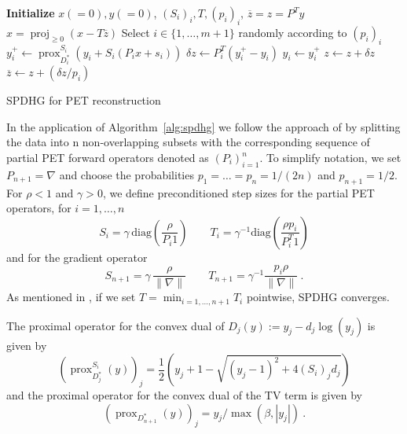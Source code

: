\documentclass[11pt,twocolumn,twoside]{article}
\DeclareMathOperator{\proj}{proj}
\DeclareMathOperator{\prox}{prox}
\begin{document}
\begin{algorithm}[t]
\begin{algorithmic}[1]
\State \textbf{Initialize} $x(=0),y(=0)$, $(S_i)_i,T,(p_i)_i$,
\State $\overline{z} = z = P^T y$
\Repeat
	\State $x = \proj_{\geq 0} (x - T \overline{z})$
	\State Select $i \in \{ 1,\ldots,m+1\} $ randomly according to $(p_i)_i$
	\State \quad $y_i^+ \gets \prox_{D_i^*}^{S_i} ( y_i + S_i  ( P_i x + s_i))$
	\State \quad $\delta z \gets P_i^T (y_i^+ - y_i)$
	\State \quad $y_i \gets y_i^+$
	\State $z \gets z + \delta z$
	\State $\overline{z} \gets  z + (\delta z/p_i)$
\State {}
\end{algorithmic}
\caption{SPDHG for PET reconstruction \cite{Ehrhardt2019}}
\label{alg:spdhg}
\end{algorithm}

In the application of Algorithm~\ref{alg:spdhg} we follow the approach of \cite{Ehrhardt2019}
by splitting the data into n non-overlapping subsets with the corresponding 
sequence of partial PET forward operators denoted as $(P_i)_{i=1}^n$.
To simplify notation, we set $P_{n+1} = \nabla$ and choose the probabilities $p_1=\ldots=p_n = 1/(2n)$
and $p_{n+1} = 1/2$.
For $\rho<1$ and $\gamma>0$, we define preconditioned step sizes for the partial PET operators, 
for $i=1,\ldots,n$
\[ S_i = \gamma \, \text{diag}(\frac{\rho}{P_i 1} )\qquad  T_i = \gamma^{-1} \text{diag}(\frac{\rho p_i}{P^T_i 1}) \]
and for the gradient operator
\[ S_{n+1} = \gamma \, \frac{\rho}{\|\nabla\|} \qquad T_{n+1} = \gamma^{-1} \frac{p_i\rho}{\|\nabla\|} \ . \]
As mentioned in \cite{Ehrhardt2019}, if we set $T = \min_{i=1,\ldots,n+1} T_i$ pointwise,
SPDHG converges.

The proximal operator for the convex dual of $D_j(y):= y_j  - d_j \log (y_j)$ is given by
\begin{equation}
(\prox_{D_j^*}^{S_i}(y))_j = \frac{1}{2} \left(y_j + 1 - \sqrt{ (y_j-1)^2 + 4 (S_i)_j d_j} \right)
\label{eq:proxD}
\end{equation} 
and the proximal operator for the convex dual of the TV term is given by
\begin{equation}
(\prox_{D_{n+1}^*}(y) )_j = y_j /\max(\beta,|y_j|) \ .
\end{equation}
\end{document}
